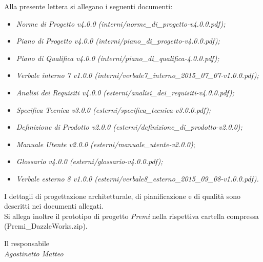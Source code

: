 \noindent Alla presente lettera si allegano i seguenti documenti:
\begin{itemize}
	\item \textit{Norme di Progetto v4.0.0 (interni/norme\_di\_progetto-v4.0.0.pdf);}
	\item \textit{Piano di Progetto v4.0.0 (interni/piano\_di\_progetto-v4.0.0.pdf);}
	\item \textit{Piano di Qualifica v4.0.0 (interni/piano\_di\_qualifica-4.0.0.pdf);}
	\item \textit{Verbale interno 7 v1.0.0 (interni/verbale7\_interno\_2015\_07\_07-v1.0.0.pdf);} 
	\item \textit{Analisi dei Requisiti v4.0.0 (esterni/analisi\_dei\_requisiti-v4.0.0.pdf);}
	\item \textit{Specifica Tecnica v3.0.0 (esterni/specifica\_tecnica-v3.0.0.pdf);}
	\item \textit{Definizione di Prodotto v2.0.0 (esterni/definizione\_di\_prodotto-v2.0.0);}
	\item \textit{Manuale Utente v2.0.0 (esterni/manuale\_utente-v2.0.0)};
	\item \textit{Glossario v4.0.0 (esterni/glossario-v4.0.0.pdf);}
	\item \textit{Verbale esterno 8 v1.0.0 (esterni/verbale8\_esterno\_2015\_09\_08-v1.0.0.pdf).}\\
\end{itemize}
I dettagli di progettazione architetturale, di pianificazione e di qualità sono descritti nei documenti allegati.\\

Si allega inoltre il prototipo di progetto \textit{Premi} nella rispettiva cartella compressa (Premi\_DazzleWorks.zip).\\

\begin{flushright}
	Il responsabile\\
	\textit{Agostinetto Matteo}
\end{flushright}